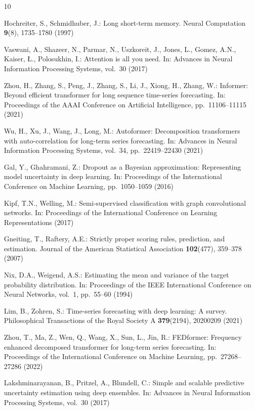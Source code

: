 \documentclass[runningheads]{llncs}
\begin{document}
\begin{thebibliography}{10}

Hochreiter, S., Schmidhuber, J.: Long short-term memory.
Neural Computation \textbf{9}(8), 1735--1780 (1997)

Vaswani, A., Shazeer, N., Parmar, N., Uszkoreit, J., Jones, L., Gomez, A.N.,
Kaiser, \L{}., Polosukhin, I.: Attention is all you need.
In: Advances in Neural Information Processing Systems, vol.~30 (2017)

Zhou, H., Zhang, S., Peng, J., Zhang, S., Li, J., Xiong, H., Zhang, W.:
Informer: Beyond efficient transformer for long sequence time-series forecasting.
In: Proceedings of the AAAI Conference on Artificial Intelligence,
pp.~11106--11115 (2021)

Wu, H., Xu, J., Wang, J., Long, M.:
Autoformer: Decomposition transformers with auto-correlation for long-term
series forecasting.
In: Advances in Neural Information Processing Systems, vol.~34,
pp.~22419--22430 (2021)

Gal, Y., Ghahramani, Z.: Dropout as a Bayesian approximation: Representing model
uncertainty in deep learning.
In: Proceedings of the International Conference on Machine Learning,
pp.~1050--1059 (2016)

Kipf, T.N., Welling, M.: Semi-supervised classification with graph convolutional
networks.
In: Proceedings of the International Conference on Learning Representations (2017)

Gneiting, T., Raftery, A.E.: Strictly proper scoring rules, prediction, and
estimation.
Journal of the American Statistical Association \textbf{102}(477),
359--378 (2007)

Nix, D.A., Weigend, A.S.: Estimating the mean and variance of the target
probability distribution.
In: Proceedings of the IEEE International Conference on Neural Networks,
vol.~1, pp.~55--60 (1994)

Lim, B., Zohren, S.: Time-series forecasting with deep learning: A survey.
Philosophical Transactions of the Royal Society A \textbf{379}(2194),
20200209 (2021)

Zhou, T., Ma, Z., Wen, Q., Wang, X., Sun, L., Jin, R.:
FEDformer: Frequency enhanced decomposed transformer for long-term series
forecasting.
In: Proceedings of the International Conference on Machine Learning,
pp.~27268--27286 (2022)

Lakshminarayanan, B., Pritzel, A., Blundell, C.:
Simple and scalable predictive uncertainty estimation using deep ensembles.
In: Advances in Neural Information Processing Systems, vol.~30 (2017)

\end{thebibliography}

\end{document}
